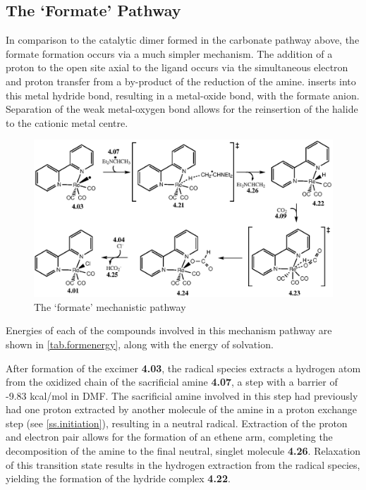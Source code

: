 \FloatBarrier

\subsection{The `Formate' Pathway}\label{ss.formate}
In comparison to the catalytic dimer formed in the carbonate pathway above, the formate formation occurs via a much simpler mechanism. The addition of a proton to the open site axial to the ligand occurs via the simultaneous electron and proton transfer from a by-product of the reduction of the amine.  inserts into this metal hydride bond, resulting in a metal-oxide bond, with the formate anion. Separation of the weak metal-oxygen bond allows for the reinsertion of the halide to the cationic metal centre. 

\begin{figure}[!htb]
 \begin{center}
  \includegraphics[clip=true, width=\textwidth, keepaspectratio]{images/formate.eps}
 \end{center}
\caption{The `formate' mechanistic pathway}
\label{fig.formate}
\end{figure} 

Energies of each of the compounds involved in this mechanism pathway are shown in \autoref{tab.formenergy}, along with the energy of solvation.




After formation of the excimer \textbf{4.03}, the radical species extracts a hydrogen atom from the oxidized chain of the sacrificial amine \textbf{4.07}, a step with a barrier of -9.83 kcal/mol in DMF. The sacrificial amine involved in this step had previously had one proton extracted by another molecule of the amine in a proton exchange step (see \autoref{ss.initiation}), resulting in a neutral radical. Extraction of the proton and electron pair allows for the formation of an ethene arm, completing the decomposition of the amine to the final neutral, singlet molecule \textbf{4.26}. Relaxation of this transition state results in the hydrogen extraction from the radical species, yielding the formation of the hydride complex \textbf{4.22}. 

